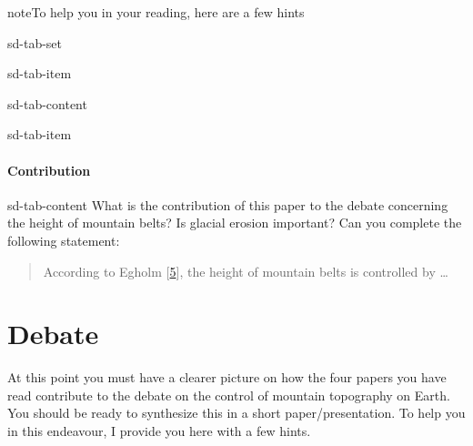 \documentclass[letterpaper,10pt,english]{jupyterBook}
\begin{document}
\begin{sphinxadmonition}{note}{To help you in your reading, here are a few hints}
\begin{sphinxuseclass}{sd-tab-set}
\begin{sphinxuseclass}{sd-tab-item}
\begin{sphinxuseclass}{sd-tab-content}
\end{sphinxuseclass}
\end{sphinxuseclass}
\begin{sphinxuseclass}{sd-tab-item}\subsubsection*{Contribution}

\begin{sphinxuseclass}{sd-tab-content}
\sphinxAtStartPar
What is the contribution of this paper to the debate concerning the height of mountain belts? Is glacial erosion important? Can you complete the following statement:
\begin{quote}

\sphinxAtStartPar
According to Egholm  {[}\hyperlink{cite.references:id8}{5}{]}, the height of mountain belts is controlled by …
\end{quote}

\end{sphinxuseclass}
\end{sphinxuseclass}
\end{sphinxuseclass}\end{sphinxadmonition}

\sphinxstepscope


\chapter{Debate}
\label{\detokenize{debate:debate}}\label{\detokenize{debate::doc}}
\sphinxAtStartPar
At this point you must have a clearer picture on how the four papers you have read contribute to the debate on the control of mountain topography on Earth. You should be ready to synthesize this in a short paper/presentation. To help you in this endeavour, I provide you here with a few hints.
\end{document}
